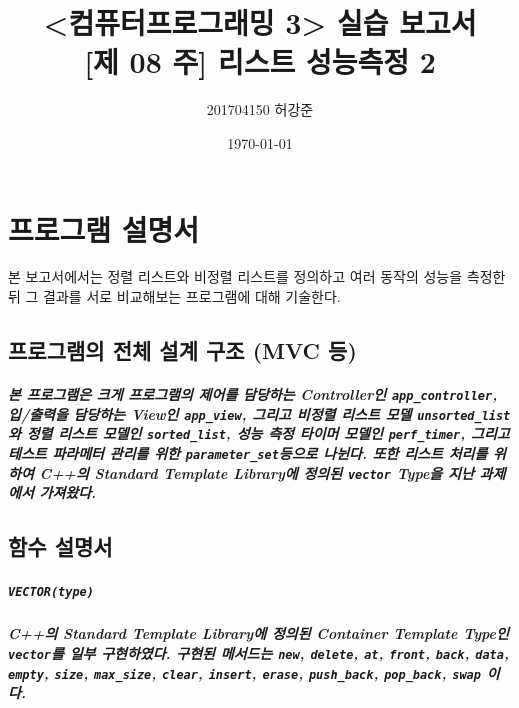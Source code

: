 \documentclass[UTF8, a4paper]{report}
\title{%
    <컴퓨터프로그래밍 3> 실습 보고서 \\ 
    \large [제 08 주] 리스트 성능측정 2}
\author{201704150 허강준}
\date{\today}
\begin{document}
    \maketitle
    \tableofcontents

    \chapter{프로그램 설명서}
        본 보고서에서는 정렬 리스트와 비정렬 리스트를 정의하고 여러 동작의 성능을 측정한 뒤 그 결과를 서로 비교해보는 프로그램에 대해 기술한다.

        \section{프로그램의 전체 설계 구조 (MVC 등)}
            
            \paragraph{%
                \normalfont 본 프로그램은 크게 프로그램의 제어를 담당하는 Controller인 \texttt{app\_controller}, 입/출력을 담당하는 View인 \texttt{app\_view}, 그리고 비정렬 리스트 모델 \texttt{unsorted\_list}와 정렬 리스트 모델인 \texttt{sorted\_list}, 성능 측정 타이머 모델인 \texttt{perf\_timer}, 그리고 테스트 파라메터 관리를 위한 \texttt{parameter\_set}등으로 나뉜다. 또한 리스트 처리를 위하여 C++의 Standard Template Library에 정의된 \texttt{vector} Type을 지난 과제에서 가져왔다.
            }
            
        \section{함수 설명서}
            
            \paragraph{\texttt{VECTOR(type)}}
            \paragraph{%
                \normalfont C++의 Standard Template Library에 정의된 Container Template Type인 \texttt{vector}를 일부 구현하였다. 구현된 메서드는 \texttt{new},  \texttt{delete}, \texttt{at}, \texttt{front}, \texttt{back}, \texttt{data}, \texttt{empty}, \texttt{size}, \texttt{max\_size}, \texttt{clear}, \texttt{insert}, \texttt{erase}, \texttt{push\_back}, \texttt{pop\_back}, \texttt{swap} 이다.
            }
\end{document}

